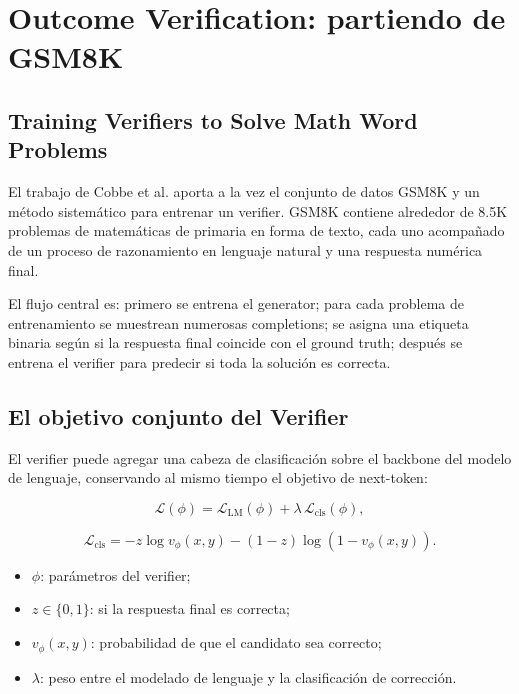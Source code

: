 \section{Outcome Verification: partiendo de GSM8K}

\subsection{Training Verifiers to Solve Math Word Problems}

El trabajo de Cobbe et al. aporta a la vez el conjunto de datos GSM8K y un método sistemático para entrenar un verifier. GSM8K contiene alrededor de 8.5K problemas de matemáticas de primaria en forma de texto, cada uno acompañado de un proceso de razonamiento en lenguaje natural y una respuesta numérica final.


El flujo central es: primero se entrena el generator; para cada problema de entrenamiento se muestrean numerosas completions; se asigna una etiqueta binaria según si la respuesta final coincide con el ground truth; después se entrena el verifier para predecir si toda la solución es correcta.


\subsection{El objetivo conjunto del Verifier}

El verifier puede agregar una cabeza de clasificación sobre el backbone del modelo de lenguaje, conservando al mismo tiempo el objetivo de next-token:

$$
\mathcal L(\phi)
=\mathcal L_{\mathrm{LM}}(\phi)
+\lambda\,\mathcal L_{\mathrm{cls}}(\phi),
$$

$$
\mathcal L_{\mathrm{cls}}
=-z\log v_{\phi}(x,y)-(1-z)\log(1-v_{\phi}(x,y)).
$$

\begin{itemize}
    \item $\phi$: parámetros del verifier;
    \item $z\in\{0,1\}$: si la respuesta final es correcta;
    \item $v_{\phi}(x,y)$: probabilidad de que el candidato sea correcto;
    \item $\lambda$: peso entre el modelado de lenguaje y la clasificación de corrección.
\end{itemize}

